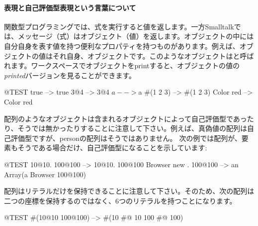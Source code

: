 \documentclass[a4paper,10pt,twoside]{book}
\begin{document}
\paragraph{表現と自己評価型表現という言葉について}
関数型プログラミングでは、式を実行すると値を返します。一方Smalltalkでは、メッセージ（式）はオブジェクト（値）を返します。オブジェクトの中には自分自身を表す値を持つ便利なプロパティを持つものがあります。例えば、オブジェクトの値はそれ自身、オブジェクトです。このようなオブジェクトはと呼ばれます。ワークスペースでオブジェクトをprintすると、オブジェクトの値の\emph{printed}バージョンを見ることができます。

\begin{code}{@TEST}
true         --> true
3@4       --> 3@4
$a           --> $a
#(1 2 3)   --> #(1 2 3)
Color red --> Color red
\end{code}

配列のようなオブジェクトは含まれるオブジェクトによって自己評価型であったり、そうでは無かったりすることに注意して下さい。例えば、真偽値の配列は自己評価型ですが、personの配列はそうではありません。
次の例では配列が、要素もそうである場合だけ、自己評価型になることを示しています:
\begin{code}{@TEST}
{10@10. 100@100}           --> {10@10. 100@100}
{Browser new . 100@100} --> an Array(a Browser 100@100)
\end{code}

配列はリテラルだけを保持できることに注意して下さい。そのため、次の配列は二つの座標を保持するのではなく、6つのリテラルを持つことになります。
\begin{code}{@TEST}
#(10@10 100@100) --> #(10 #@ 10 100 #@ 100)
\end{code}
\end{document}
